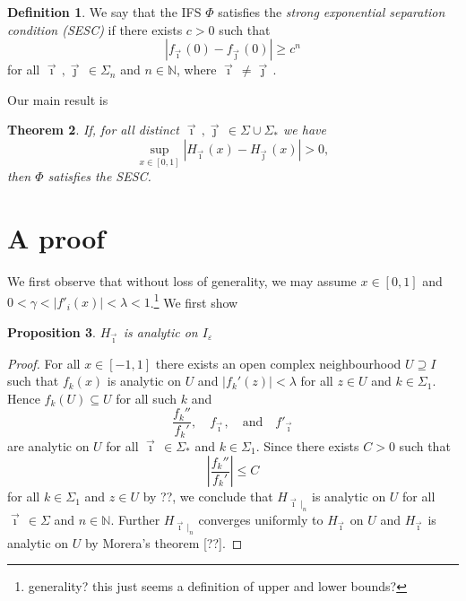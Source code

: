 \documentclass[12pt,]{article}
\newtheorem{theorem}{Theorem}[section]
\newtheorem{proposition}[theorem]{Proposition}
\theoremstyle{definition}
\newtheorem{definition}[theorem]{Definition}
\theoremstyle{remark}
\renewcommand{\Bbb}[1]{\mathbb{#1}}
\newcommand{\bbN}{{\Bbb N}}         %
\newcommand{\0}{\mathbf{0}}
\newcommand{\eps}{\varepsilon}
\newcommand{\bi}{\vec{\imath}\,}
\newcommand{\bj}{\vec{\jmath}\,}
\newcommand{\rfootnote}[1]{\footnote{\color{red}#1}}
\begin{document}
\begin{definition}
  We say that the IFS $\Phi$ satisfies the \emph{strong exponential separation condition (SESC)} if
  there exists $c>0$ such that 
  \[
    |f_{\bi}(0)-f_{\bj}(0)| \geq c^n
  \]
  for all $\bi,\bj\in\Sigma_n$ and $n\in\bbN$, where $\bi\neq\bj$.
\end{definition}

Our main result is
\begin{theorem}
  If, for all distinct $\bi,\bj \in\Sigma\cup\Sigma_*$ we have
  \[
    \sup_{x\in[0,1]} |H_{\bi}(x) - H_{\bj}(x)| > 0,
  \]
  then $\Phi$ satisfies the SESC.
\end{theorem}






\section{A proof}\label{sec:proof}
We first observe that without loss of generality, we may assume $x\in[0,1]$ and
$0<\gamma<|f'_i(x)|<\lambda<1$.\rfootnote{generality? this just seems a definition of upper and lower
bounds?}
We first show
\begin{proposition}
  $H_{\bi}$ is analytic on $I_{\eps}$
\end{proposition}
\begin{proof}
  For all $x\in [-1,1]$ there exists an open complex neighbourhood $U \supseteq I$ such that
  $f_k(x)$ is analytic on $U$ and $|f_k'(z)|<\lambda$ for all $z\in U$ and $k\in\Sigma_1$.
  Hence $f_k(U) \subseteq U$ for all such $k$ and 
  \[
    \frac{f_k''}{f_k'},\quad f_{\bi}, \quad\text{and} \quad f'_{\bi}
  \]
  are analytic on $U$ for all $\bi\in\Sigma_*$ and $k\in\Sigma_1$.
  Since there exists $C>0$ such that 
  \[
\left|\frac{f_k''}{f_k'}\right| \leq C
  \]
  for all $k\in\Sigma_1$ and $z\in U$ by ??, we conclude that $H_{\bi|_n}$ is analytic on $U$ for
  all $\bi\in\Sigma$ and $n\in\bbN$. Further $H_{\bi|_n}$ converges uniformly to $H_{\bi}$ on $U$
  and $H_{\bi}$ is analytic on $U$ by Morera's theorem [??].
\end{proof}
\end{document}
